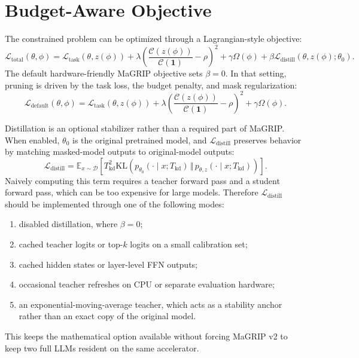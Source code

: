 \documentclass[11pt]{article}
\newcommand{\E}{\mathbb{E}}
\newcommand{\Loss}{\mathcal{L}}
\newcommand{\Cost}{\mathcal{C}}
\newcommand{\Data}{\mathcal{D}}
\newcommand{\KL}{\mathrm{KL}}
\begin{document}
\section{Budget-Aware Objective}

The constrained problem can be optimized through a Lagrangian-style objective:
\begin{equation}
  \Loss_{\mathrm{total}}(\theta,\phi)
  =
  \Loss_{\mathrm{task}}(\theta,z(\phi))
  +
  \lambda
  \left(
    \frac{\Cost(z(\phi))}{\Cost(\bm{1})} - \rho
  \right)^2
  +
  \gamma \Omega(\phi)
  +
  \beta \Loss_{\mathrm{distill}}(\theta,z(\phi);\theta_0)
  .
  \label{eq:total-objective}
\end{equation}
The default hardware-friendly MaGRIP objective sets $\beta=0$. In that setting, pruning is driven by the task loss, the budget penalty, and mask regularization:
\begin{equation}
  \Loss_{\mathrm{default}}(\theta,\phi)
  =
  \Loss_{\mathrm{task}}(\theta,z(\phi))
  +
  \lambda
  \left(
    \frac{\Cost(z(\phi))}{\Cost(\bm{1})} - \rho
  \right)^2
  +
  \gamma \Omega(\phi).
  \label{eq:default-objective}
\end{equation}

Distillation is an optional stabilizer rather than a required part of MaGRIP. When enabled, $\theta_0$ is the original pretrained model, and $\Loss_{\mathrm{distill}}$ preserves behavior by matching masked-model outputs to original-model outputs:
\begin{equation}
  \Loss_{\mathrm{distill}}
  =
  \E_{x\sim\Data}
  \left[
    T_{\mathrm{kd}}^2
    \KL
    \left(
      p_{\theta_0}(\cdot\mid x;T_{\mathrm{kd}})
      \,\Vert\,
      p_{\theta,z}(\cdot\mid x;T_{\mathrm{kd}})
    \right)
  \right].
\end{equation}
Naively computing this term requires a teacher forward pass and a student forward pass, which can be too expensive for large models. Therefore $\Loss_{\mathrm{distill}}$ should be implemented through one of the following modes:
\begin{enumerate}[leftmargin=*]
  \item disabled distillation, where $\beta=0$;
  \item cached teacher logits or top-$k$ logits on a small calibration set;
  \item cached hidden states or layer-level FFN outputs;
  \item occasional teacher refreshes on CPU or separate evaluation hardware;
  \item an exponential-moving-average teacher, which acts as a stability anchor rather than an exact copy of the original model.
\end{enumerate}
This keeps the mathematical option available without forcing MaGRIP v2 to keep two full LLMs resident on the same accelerator.
\end{document}
